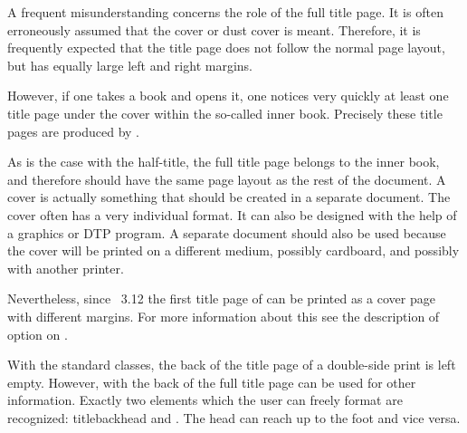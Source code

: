 \begin{Explain}
  A frequent misunderstanding concerns the role of the full title page.  It is
  often erroneously assumed that the cover or dust cover is
  meant.  Therefore, it is frequently expected that the title page does not
  follow the normal page layout, but has equally large left and right margins.

  However, if one takes a book and opens it, one notices very quickly at least
  one title page under the cover within the so-called inner book.  Precisely
  these title pages are produced by
  .

  As is the case with the half-title, the full title page belongs to the inner
  book, and therefore should have the same page layout as the rest of the
  document.  A cover is actually something that should be created in a
  separate document. The cover often has a very individual format. It can also
  be designed with the help of a graphics or DTP program. A separate document
  should also be used because the cover will be printed on a different medium,
  possibly cardboard, and possibly with another printer.

  Nevertheless, since \KOMAScript~3.12 the first title page of
   can be printed as a cover page
  with different margins. For more information about this see the description
  of option
   on
  .
\end{Explain}
%
\EndIndexGroup


\begin{Declaration}
\end{Declaration}%
With the standard classes, the back of the title page of a double-side print
is left empty.  However, with {\KOMAScript} the back of the full title page
can be used for other information. Exactly two elements which the user can
freely format are recognized: \PName
{titlebackhead}
and . The head can reach up to the foot and vice
versa. %
%
\EndIndexGroup


